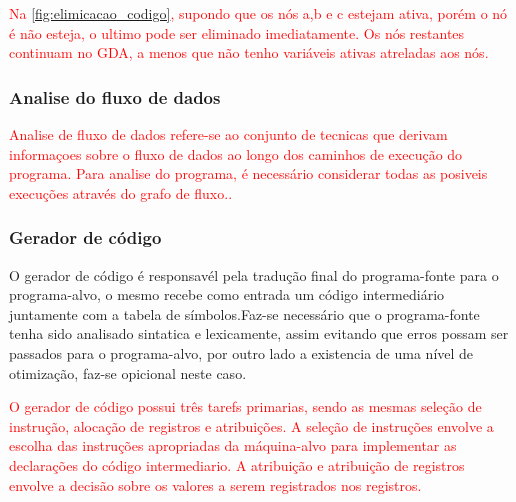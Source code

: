\textcolor{red}{Na \autoref{fig:elimicacao_codigo}, supondo que os nós a,b e c estejam ativa, porém o nó é não esteja, o ultimo pode ser eliminado imediatamente. Os nós restantes continuam no GDA, a menos que não tenho variáveis ativas atreladas aos nós\cite{aho2007compilers}.}
\subsubsection{Analise do fluxo de dados}
\par
\textcolor{red}{Analise de fluxo de dados refere-se ao conjunto de tecnicas que derivam informaçoes sobre o fluxo de dados ao longo dos caminhos de execução do programa. Para analise do programa, é necessário considerar todas as posiveis execuções através do grafo de fluxo.\cite{aho2007compilers}.}

\subsubsection{Gerador de código}
\par
O gerador de código é responsavél pela tradução final do programa-fonte para o programa-alvo, o mesmo recebe como entrada um código intermediário juntamente com a tabela de símbolos.Faz-se necessário que o programa-fonte tenha sido analisado sintatica e lexicamente, assim evitando que erros possam ser passados para o programa-alvo, por outro lado a existencia de uma nível de otimização, faz-se opicional neste caso\cite{aho2007compilers}.

\par
\textcolor{red}{O gerador de código possui três tarefs primarias, sendo as mesmas seleção de instrução, alocação de registros e atribuições. A seleção de instruções envolve a escolha das instruções apropriadas da máquina-alvo para implementar as declarações do código intermediario. A atribuição e atribuição de registros envolve a decisão sobre os valores a serem registrados nos registros\cite{aho2007compilers}.}

